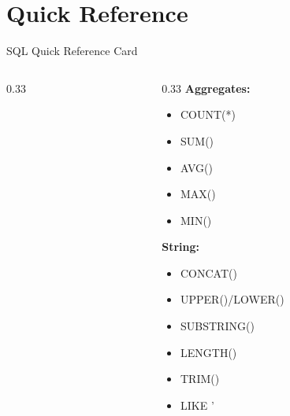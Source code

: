 \documentclass[aspectratio=169,11pt]{beamer}
\begin{document}
\section{Quick Reference}

\begin{frame}{SQL Quick Reference Card}
\begin{columns}[T]
\begin{column}{0.33\textwidth}
\end{column}

\pause
\begin{column}{0.33\textwidth}
\textbf{Aggregates:}
\begin{itemize}
    \item COUNT(*)
    \item SUM()
    \item AVG()
    \item MAX()
    \item MIN()
\end{itemize}

\vspace{0.5cm}
\textbf{String:}
\begin{itemize}
    \item CONCAT()
    \item UPPER()/LOWER()
    \item SUBSTRING()
    \item LENGTH()
    \item TRIM()
    \item LIKE '%
\end{itemize}
\end{column}


\end{columns}
\end{frame}
\end{document}
